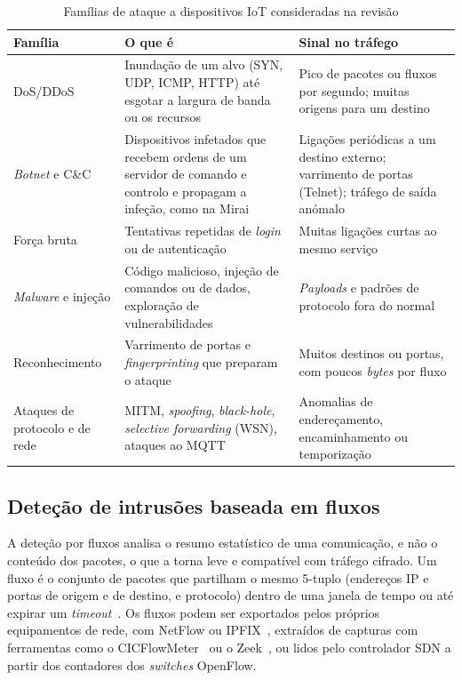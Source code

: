 \documentclass[conference,a4paper]{IEEEtran}
\begin{document}
\begin{table}[H]
\caption{Famílias de ataque a dispositivos IoT consideradas na revisão}\label{tab:ameacas}
\centering\scriptsize
\setlength{\tabcolsep}{3pt}
\begin{tabular}{@{}>{\raggedright\arraybackslash}p{}>{\raggedright\arraybackslash}p{}>{\raggedright\arraybackslash}p{}@{}}
\toprule
Família & O que é & Sinal no tráfego \\
\midrule
DoS/DDoS & Inundação de um alvo (SYN, UDP, ICMP, HTTP) até esgotar a largura de banda ou os recursos & Pico de pacotes ou fluxos por segundo; muitas origens para um destino \\
\textit{Botnet} e C\&C & Dispositivos infetados que recebem ordens de um servidor de comando e controlo e propagam a infeção, como na Mirai~\cite{antonakakis2017mirai} & Ligações periódicas a um destino externo; varrimento de portas (Telnet); tráfego de saída anómalo \\
Força bruta & Tentativas repetidas de \textit{login} ou de autenticação & Muitas ligações curtas ao mesmo serviço \\
\textit{Malware} e injeção & Código malicioso, injeção de comandos ou de dados, exploração de vulnerabilidades & \textit{Payloads} e padrões de protocolo fora do normal \\
Reconhecimento & Varrimento de portas e \textit{fingerprinting} que preparam o ataque & Muitos destinos ou portas, com poucos \textit{bytes} por fluxo \\
Ataques de protocolo e de rede & MITM, \textit{spoofing}, \textit{black-hole}, \textit{selective forwarding} (WSN), ataques ao MQTT~\cite{karam2025isaaf} & Anomalias de endereçamento, encaminhamento ou temporização \\
\bottomrule
\end{tabular}
\end{table}

\subsection{Deteção de intrusões baseada em fluxos}
A deteção por fluxos analisa o resumo estatístico de uma comunicação, e não o conteúdo dos
pacotes, o que a torna leve e compatível com tráfego cifrado. Um fluxo é o conjunto de
pacotes que partilham o mesmo 5-tuplo (endereços IP e portas de origem e de destino, e
protocolo) dentro de uma janela de tempo ou até expirar um
\textit{timeout}~\cite{rfc7011}. Os fluxos podem ser exportados pelos próprios
equipamentos de rede, com NetFlow ou IPFIX~\cite{rfc3954,rfc7011}, extraídos de capturas
com ferramentas como o CICFlowMeter~\cite{lashkari2017cicflowmeter} ou o
Zeek~\cite{paxson1999bro}, ou lidos pelo controlador SDN a partir dos contadores dos
\textit{switches} OpenFlow.
\end{document}
